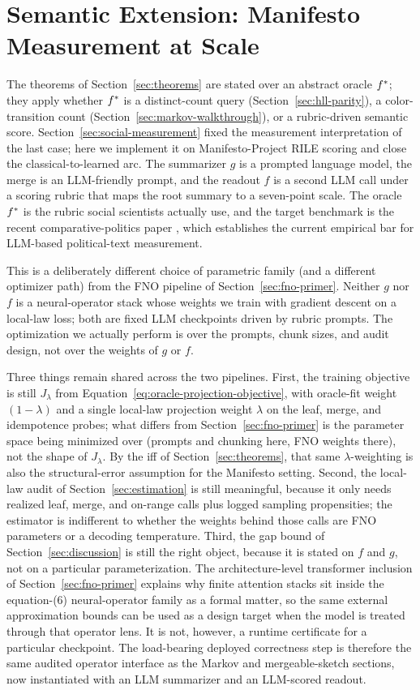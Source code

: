 \section{Semantic Extension: Manifesto Measurement at Scale}\label{sec:manifesto-llm}

The theorems of Section~\ref{sec:theorems} are stated over an abstract oracle $f^\ast$; they apply whether $f^\ast$ is a distinct-count query (Section~\ref{sec:hll-parity}), a color-transition count (Section~\ref{sec:markov-walkthrough}), or a rubric-driven semantic score. Section~\ref{sec:social-measurement} fixed the measurement interpretation of the last case; here we implement it on Manifesto-Project RILE scoring and close the classical-to-learned arc. The summarizer $g$ is a prompted language model, the merge is an LLM-friendly prompt, and the readout $f$ is a second LLM call under a scoring rubric that maps the root summary to a seven-point scale. The oracle $f^\ast$ is the rubric social scientists actually use, and the target benchmark is the recent comparative-politics paper \citet{BenoitEtAl2025}, which establishes the current empirical bar for LLM-based political-text measurement.

This is a deliberately different choice of parametric family (and a
different optimizer path) from the FNO pipeline of
Section~\ref{sec:fno-primer}. Neither $g$ nor $f$ is a neural-operator
stack whose weights we train with gradient descent on a local-law loss;
both are fixed LLM checkpoints driven by rubric prompts. The
optimization we actually perform is over the prompts, chunk sizes, and
audit design, not over the weights of $g$ or $f$.

Three things remain shared across the two pipelines. First, the
training objective is still
$J_\lambda$ from Equation~\eqref{eq:oracle-projection-objective}, with
oracle-fit weight $(1-\lambda)$ and a single local-law projection
weight $\lambda$ on the leaf, merge, and idempotence probes; what
differs from Section~\ref{sec:fno-primer} is the parameter space being
minimized over (prompts and chunking here, FNO weights there), not the
shape of $J_\lambda$. By the iff of Section~\ref{sec:theorems}, that
same $\lambda$-weighting is also the structural-error assumption for
the Manifesto setting. Second, the local-law audit of
Section~\ref{sec:estimation} is still meaningful, because it only needs
realized leaf, merge, and on-range calls plus logged sampling
propensities; the estimator is indifferent to whether the weights behind
those calls are FNO parameters or a decoding temperature. Third, the
gap bound of Section~\ref{sec:discussion} is still the right object,
because it is stated on $f$ and $g$, not on a particular
parameterization. The architecture-level transformer inclusion of
Section~\ref{sec:fno-primer} explains why finite attention stacks sit
inside the equation-(6) neural-operator family as a formal matter, so
the same external approximation bounds can be used as a design target
when the model is treated through that operator lens. It is not,
however, a runtime certificate for a particular checkpoint. The
load-bearing deployed correctness step is therefore the same audited
operator interface as the Markov and mergeable-sketch sections, now
instantiated with an LLM summarizer and an LLM-scored readout.

